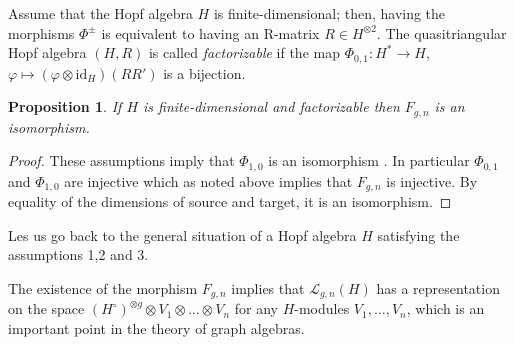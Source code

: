 \documentclass[11pt]{amsart}
\newtheorem{prop}[teo]{Proposition}
\begin{document}
\indent  Assume that the Hopf algebra $H$ is finite-dimensional; then, having the morphisms $\Phi^{\pm}$ is equivalent to having an R-matrix $R \in H^{\otimes 2}$. The quasitriangular Hopf algebra $(H,R)$ is called {\em factorizable} if the map $\Phi_{0,1} : H^* \to H$, $\varphi \mapsto (\varphi \otimes \mathrm{id}_H)(RR')$ is a bijection.
\begin{prop}\label{coroLgnFacto}
If $H$ is finite-dimensional and factorizable then $F_{g,n}$ is an isomorphism.
\end{prop}
\begin{proof}
These assumptions imply that $\Phi_{1,0}$ is an isomorphism \cite[Th.\,4.8]{FaitgSL2Z}. In particular $\Phi_{0,1}$ and $\Phi_{1,0}$ are injective which as noted above implies that $F_{g,n}$ is injective. By equality of the dimensions of source and target, it is an isomorphism.
\end{proof}

\indent Les us go back to the general situation of a Hopf algebra $H$ satisfying the assumptions 1,2 and 3.

\indent The existence of the morphism $F_{g,n}$ implies that $\mathcal{L}_{g,n}(H)$ has a representation on the space $(H^\circ)^{\otimes g} \otimes V_1 \otimes \ldots \otimes V_n$ for any $H$-modules $V_1,\ldots,V_n$, which is an important point in the theory of graph algebras.

\smallskip
\end{document}
